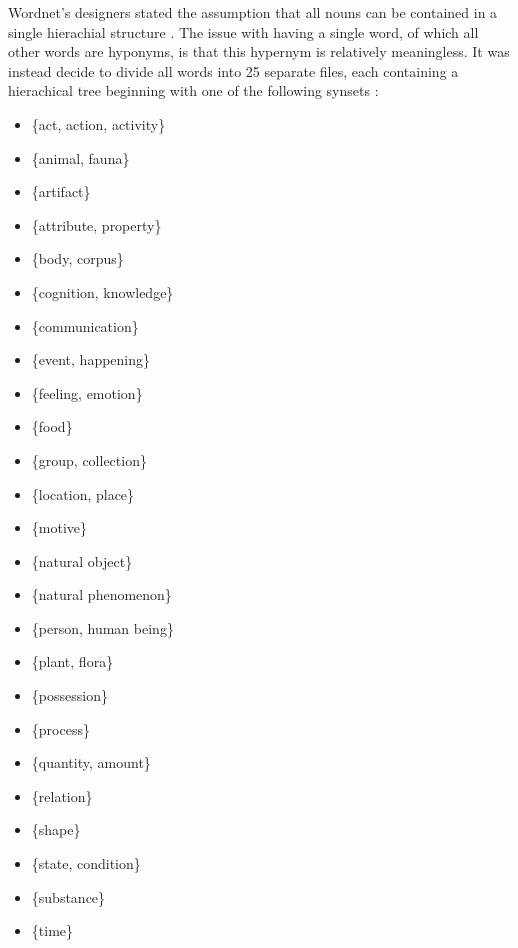 \documentclass[]{article}
\begin{document}
Wordnet's designers stated the assumption that all nouns can be contained in a single hierachial structure \cite{WN2Nouns}. The issue with having a single word, of which all other words are hyponyms, is that this hypernym is relatively meaningless. It was instead decide to divide all words into 25 separate files, each containing a hierachical tree beginning with one of the following synsets \cite{WN2Nouns}:

\begin{multicols}{2}
\begin{itemize}
	\item[] \{act, action, activity\}
	\item[] \{animal, fauna\}
	\item[] \{artifact\}
	\item[] \{attribute, property\}
	\item[] \{body, corpus\}
	\item[] \{cognition, knowledge\}
	\item[] \{communication\}
	\item[] \{event, happening\}
	\item[] \{feeling, emotion\}
	\item[] \{food\}
	\item[] \{group, collection\}
	\item[] \{location, place\}
	\item[] \{motive\}
	\item[] \{natural object\}
	\item[] \{natural phenomenon\}
	\item[] \{person, human being\}
	\item[] \{plant, flora\}
	\item[] \{possession\}
	\item[] \{process\}
	\item[] \{quantity, amount\}
	\item[] \{relation\}
	\item[] \{shape\}
	\item[] \{state, condition\}
	\item[] \{substance\}
	\item[] \{time\}
\end{itemize}
\end{multicols}
\end{document}
